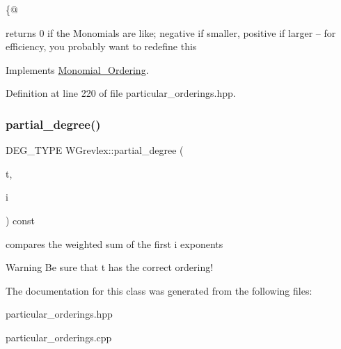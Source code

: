 \{@ 

returns 0 if the Monomials are like; negative if smaller, positive if larger -- for efficiency, you probably want to redefine this 

Implements \hyperlink{class_monomial___ordering_a9bc3155fc98b4d40c26118fa2114b827}{Monomial\+\_\+\+Ordering}.



Definition at line 220 of file particular\+\_\+orderings.\+hpp.

\mbox{\label{class_w_grevlex_ad7e630709c14774bac365c46b9455bab}} 
\subsubsection{\texorpdfstring{partial\+\_\+degree()}{partial\_degree()}}
{\footnotesize\ttfamily D\+E\+G\+\_\+\+T\+Y\+PE W\+Grevlex\+::partial\+\_\+degree (\begin{DoxyParamCaption}\item[{const \hyperlink{class_monomial}{Monomial} \&}]{t,  }\item[{N\+V\+A\+R\+\_\+\+T\+Y\+PE}]{i }\end{DoxyParamCaption}) const}



compares the weighted sum of the first i exponents 

\begin{DoxyWarning}{Warning}
Be sure that {\ttfamily t} has the correct ordering! 
\end{DoxyWarning}


The documentation for this class was generated from the following files\+:\begin{DoxyCompactItemize}
\item 
particular\+\_\+orderings.\+hpp\item 
particular\+\_\+orderings.\+cpp\end{DoxyCompactItemize}
